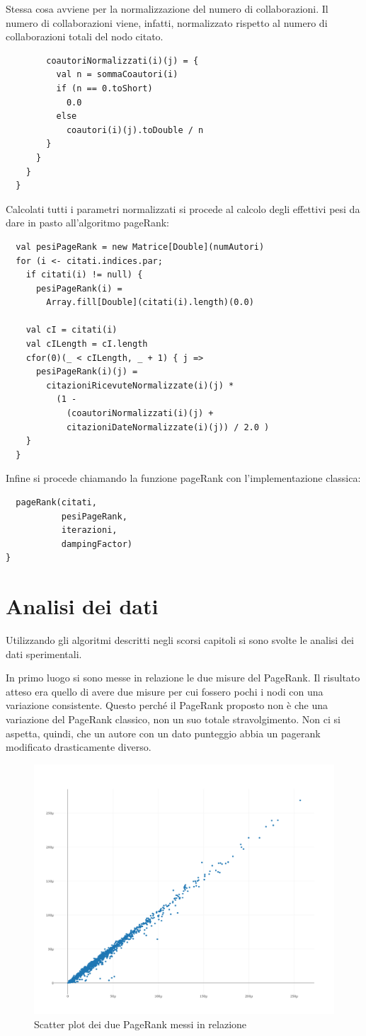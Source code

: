 \documentclass[a4paper, 12pt]{article}
\let\oldsection\section
\renewcommand\section{\clearpage\oldsection}
\begin{document}
Stessa cosa avviene per la normalizzazione del numero di collaborazioni. Il numero di collaborazioni viene, infatti, normalizzato rispetto al numero di collaborazioni totali del nodo citato.
\begin{lstlisting} 
        coautoriNormalizzati(i)(j) = {
          val n = sommaCoautori(i)
          if (n == 0.toShort) 
            0.0 
          else 
            coautori(i)(j).toDouble / n
        }
      }
    }
  }
\end{lstlisting}
Calcolati tutti i parametri normalizzati si procede al calcolo degli effettivi pesi da dare in pasto all'algoritmo pageRank:
\begin{lstlisting}
  val pesiPageRank = new Matrice[Double](numAutori)
  for (i <- citati.indices.par; 
    if citati(i) != null) {
      pesiPageRank(i) = 
        Array.fill[Double](citati(i).length)(0.0)

    val cI = citati(i)
    val cILength = cI.length
    cfor(0)(_ < cILength, _ + 1) { j =>
      pesiPageRank(i)(j) =
        citazioniRicevuteNormalizzate(i)(j) * 
          (1 - 
            (coautoriNormalizzati(i)(j) +
            citazioniDateNormalizzate(i)(j)) / 2.0 )
    }
  }
\end{lstlisting}
Infine si procede chiamando la funzione pageRank con l'implementazione classica:
\begin{lstlisting}
  pageRank(citati,
           pesiPageRank,
           iterazioni,
           dampingFactor)
}
\end{lstlisting}

\section{Analisi dei dati}
Utilizzando gli algoritmi descritti negli scorsi capitoli si sono svolte le analisi dei dati sperimentali.

In primo luogo si sono messe in relazione le due misure del PageRank. Il risultato atteso era quello di avere due misure per cui fossero pochi i nodi con una variazione consistente. Questo perché il PageRank proposto non è che una variazione del PageRank classico, non un suo totale stravolgimento. Non ci si aspetta, quindi, che un autore con un dato punteggio abbia un pagerank modificato drasticamente diverso.
\begin{figure}[H]
  \includegraphics[width=0.7\linewidth]{images/grafico-1.png}
  \caption{Scatter plot dei due PageRank messi in relazione}
\end{figure}
\end{document}
